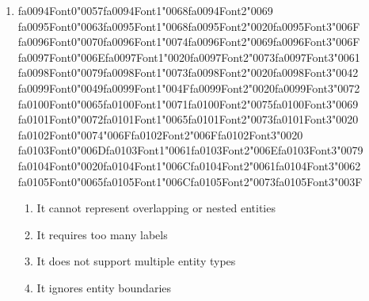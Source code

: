 \documentclass[12pt]{article}
\begin{document}
\begin{enumerate}[label=Q\arabic*.]
\item {\csname fa0094Font0\endcsname\char"0057}{\csname fa0094Font1\endcsname\char"0068}{\csname fa0094Font2\endcsname\char"0069} {\csname fa0095Font0\endcsname\char"0063}{\csname fa0095Font1\endcsname\char"0068}{\csname fa0095Font2\endcsname\char"0020}{\csname fa0095Font3\endcsname\char"006F} {\csname fa0096Font0\endcsname\char"0070}{\csname fa0096Font1\endcsname\char"0074}{\csname fa0096Font2\endcsname\char"0069}{\csname fa0096Font3\endcsname\char"006F} {\csname fa0097Font0\endcsname\char"006E}{\csname fa0097Font1\endcsname\char"0020}{\csname fa0097Font2\endcsname\char"0073}{\csname fa0097Font3\endcsname\char"0061} {\csname fa0098Font0\endcsname\char"0079}{\csname fa0098Font1\endcsname\char"0073}{\csname fa0098Font2\endcsname\char"0020}{\csname fa0098Font3\endcsname\char"0042} {\csname fa0099Font0\endcsname\char"0049}{\csname fa0099Font1\endcsname\char"004F}{\csname fa0099Font2\endcsname\char"0020}{\csname fa0099Font3\endcsname\char"0072} {\csname fa0100Font0\endcsname\char"0065}{\csname fa0100Font1\endcsname\char"0071}{\csname fa0100Font2\endcsname\char"0075}{\csname fa0100Font3\endcsname\char"0069} {\csname fa0101Font0\endcsname\char"0072}{\csname fa0101Font1\endcsname\char"0065}{\csname fa0101Font2\endcsname\char"0073}{\csname fa0101Font3\endcsname\char"0020} {\csname fa0102Font0\endcsname\char"0074}{\char"006F}{\csname fa0102Font2\endcsname\char"006F}{\csname fa0102Font3\endcsname\char"0020} {\csname fa0103Font0\endcsname\char"006D}{\csname fa0103Font1\endcsname\char"0061}{\csname fa0103Font2\endcsname\char"006E}{\csname fa0103Font3\endcsname\char"0079} {\csname fa0104Font0\endcsname\char"0020}{\csname fa0104Font1\endcsname\char"006C}{\csname fa0104Font2\endcsname\char"0061}{\csname fa0104Font3\endcsname\char"0062} {\csname fa0105Font0\endcsname\char"0065}{\csname fa0105Font1\endcsname\char"006C}{\csname fa0105Font2\endcsname\char"0073}{\csname fa0105Font3\endcsname\char"003F}
\begin{enumerate}[label=(\Alph*)]
    \item It cannot represent overlapping or nested entities
    \item It requires too many labels
    \item It does not support multiple entity types
    \item It ignores entity boundaries
\end{enumerate}

\end{enumerate}
\end{document}

